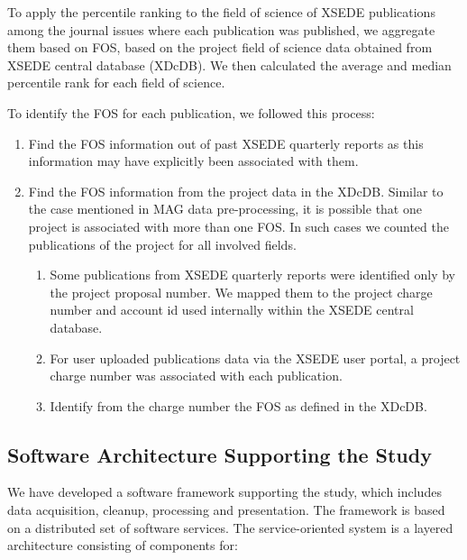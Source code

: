 \documentclass{sig-alternate}
\begin{document}
To apply the percentile ranking to the field of science of XSEDE publications
among the journal issues where each publication was published, we aggregate
them based on FOS, based on the project field of science data obtained from XSEDE central
database (XDcDB). We then calculated the average and median percentile rank for each field
of science.

To identify the FOS for each publication, we followed this process:

\begin{enumerate}

\item Find the FOS information out of past XSEDE quarterly reports as this
information may have explicitly been associated with them.

\item Find the FOS information from the project data in the XDcDB. Similar to the case mentioned
in MAG data pre-processing, it is possible that one project is associated with more
than one FOS. In such cases we counted the publications of the project for all involved fields.

\begin{enumerate}

\item Some publications from XSEDE quarterly reports were identified only by
the project proposal number. We mapped them to the project charge number
and account id used internally within the XSEDE central database.

\item For user uploaded publications data via the XSEDE user portal, a project
charge number was associated with each publication.

\item Identify from the charge number the FOS as defined in the XDcDB.

\end{enumerate}

\end{enumerate}

\subsection{Software Architecture Supporting the Study}

We have developed a software framework supporting the study, which includes data acquisition,
cleanup, processing and presentation. The framework is based on a distributed set of software
services. The service-oriented system is a layered architecture consisting of components for:
\end{document}
